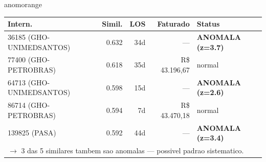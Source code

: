 \documentclass[a4paper,10pt]{article}
\begin{document}
\begin{anomalycard}[Internacao 3592 | GHO-AMIL | ALTO (z=3.08)]{anomorange}
\begin{tabular}{l r r r l}\toprule\textbf{Intern.} & \textbf{Simil.} & \textbf{LOS} & \textbf{Faturado} & \textbf{Status} \\\midrule
36185 (GHO-UNIMEDSANTOS) & 0.632 & 34d & --- & \textcolor{anomred}{\textbf{ANOMALA (z=3.7)}} \\
77400 (GHO-PETROBRAS) & 0.618 & 35d & R\$ 43.196,67 & \textcolor{jcubeblue}{normal} \\
64713 (GHO-UNIMEDSANTOS) & 0.598 & 15d & --- & \textcolor{anomred}{\textbf{ANOMALA (z=2.6)}} \\
86714 (GHO-PETROBRAS) & 0.594 & 7d & R\$ 43.470,18 & \textcolor{jcubeblue}{normal} \\
139825 (PASA) & 0.592 & 44d & --- & \textcolor{anomred}{\textbf{ANOMALA (z=3.4)}} \\
\multicolumn{5}{l}{\textcolor{anomred}{\small $\rightarrow$ 3 das 5 similares tambem sao anomalas --- possivel padrao sistematico.}} \\
\bottomrule\end{tabular}


\end{anomalycard}

\newpage
\end{document}
